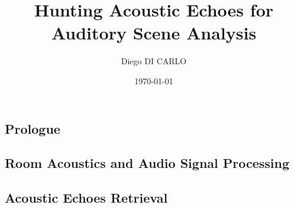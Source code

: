 \documentclass[pdftex,dvipsnames]{dissertation}
\title{Hunting Acoustic Echoes for Auditory Scene Analysis}
\author{Diego DI CARLO}
\date{\today}
\begin{document}
\frontmatter{}


% 



\blankpage{}

\blankpage{}


\cleardoublepage{}

\tableofcontents*{}
\clearpage{}


\vspace{\baselineskip}
\clearpage{}

\listoffigures*{}
\vspace{\baselineskip}
\clearpage{}

\listoftables*{}
\clearpage{}


\cleardoublepage{}

\mainmatter{}
\begin{fullwidth}
\part{Prologue}
\end{fullwidth}
\cleardoublepage{}

% 


\begin{fullwidth}
    \part{Room Acoustics and Audio Signal Processing}
\end{fullwidth}




\begin{fullwidth}
\part{Acoustic Echoes Retrieval}
\end{fullwidth}




\end{document}

